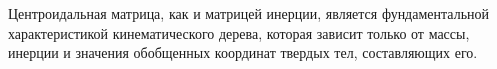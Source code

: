 Центроидальная матрица, как и матрицей инерции, является фундаментальной характеристикой кинематического дерева, которая зависит только от массы, инерции и значения обобщенных координат твердых тел, составляющих его.




